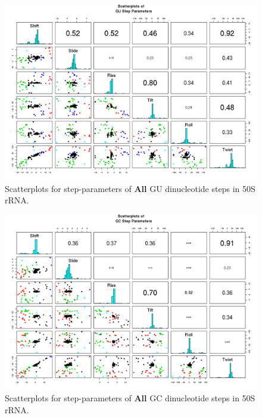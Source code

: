 \begin{figure}[H]
\centering
\includegraphics[angle=90, scale=0.6]{All/GU.png}
\caption{Scatterplots for step-parameters of \textbf{All} GU dinucleotide steps
in 50S rRNA.}
\label{fig:stepsGU}
\end{figure}

\begin{figure}[H]
\centering
\includegraphics[angle=90, scale=0.6]{All/GC.png}
\caption{Scatterplots for step-parameters of \textbf{All} GC dinucleotide steps
in 50S rRNA.}
\label{fig:stepsGC}
\end{figure}


